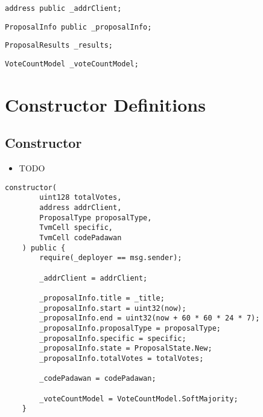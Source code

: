\begin{lstlisting}[firstnumber=16]
    address public _addrClient;
\end{lstlisting}

\begin{lstlisting}[firstnumber=18]
    ProposalInfo public _proposalInfo;
\end{lstlisting}

\begin{lstlisting}[firstnumber=20]
    ProposalResults _results;
\end{lstlisting}

\begin{lstlisting}[firstnumber=21]
    VoteCountModel _voteCountModel;
\end{lstlisting}

\section{Constructor Definitions}


\subsection{Constructor}

\begin{itemize}
\item TODO
\end{itemize}

\begin{lstlisting}[firstnumber=25]
    constructor(
        uint128 totalVotes,
        address addrClient,
        ProposalType proposalType,
        TvmCell specific,
        TvmCell codePadawan
    ) public {
        require(_deployer == msg.sender);

        _addrClient = addrClient;

        _proposalInfo.title = _title;
        _proposalInfo.start = uint32(now);
        _proposalInfo.end = uint32(now + 60 * 60 * 24 * 7);
        _proposalInfo.proposalType = proposalType;
        _proposalInfo.specific = specific;
        _proposalInfo.state = ProposalState.New;
        _proposalInfo.totalVotes = totalVotes;

        _codePadawan = codePadawan;

        _voteCountModel = VoteCountModel.SoftMajority;
    }
\end{lstlisting}

